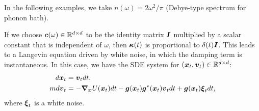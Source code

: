In the following examples, we take $n(\omega) =  2\omega^2/\pi$ (Debye-type spectrum for phonon bath).

\begin{example}
If we choose $\boldsymbol{c}(\omega) \in \mathbb{R}^{d \times d}$ to be the identity matrix $\boldsymbol{I}$ multiplied by a scalar constant that is independent of $\omega$, then $\boldsymbol{\kappa}(t)$ is proportional to $\delta(t) \boldsymbol{I}$. This leads to a Langevin equation driven by white noise, in which the damping term is instantaneous. In this case, we have the SDE system for $(\boldsymbol{x}_t, \boldsymbol{v}_t) \in \mathbb{R}^{d \times d}$: 
\begin{align}
d \boldsymbol{x}_t &= \boldsymbol{v}_t dt, \label{side_derived1} \\ 
m d \boldsymbol{v}_t &= -\boldsymbol{\nabla}_{\boldsymbol{x}} U (\boldsymbol{x}_t) dt - \boldsymbol{g}(\boldsymbol{x}_t) \boldsymbol{g}^*(\boldsymbol{x}_t)\boldsymbol{v}_t dt + \boldsymbol{g}(\boldsymbol{x}_t) \boldsymbol{\xi}_t dt, \label{side_derived2}  
\end{align}
where $\boldsymbol{\xi}_t$ is a white noise.      
\end{example}


